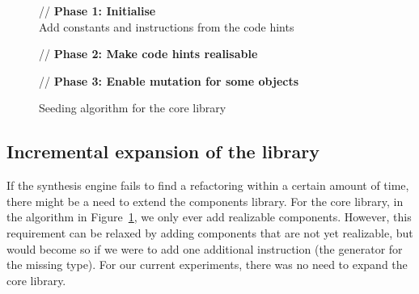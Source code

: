 \documentclass[sigconf,review,anonymous]{acmart}
\makeatletter
\newcommand{\removelatexerror}{\let\@latex@error\@gobble}
\makeatother
\begin{document}
\begin{figure}
\removelatexerror%
\begin{algorithm}[H]
\SetAlgoLined
{}
// {\bf Phase 1: Initialise}\\
Add constants and instructions from the code hints\;

// {\bf Phase 2: Make code hints realisable}\\

// {\bf Phase 3: Enable mutation for some objects}\\
\end{algorithm}
 \caption{Seeding algorithm for the core library}
\label{alg:seeding-core}
\end{figure}



\subsection{Incremental expansion of the library} \label{sec:extend-library}
If the synthesis engine fails to find a refactoring within a certain amount of time,
there might be a need to extend the components library.
For the core library, in the algorithm in Figure~\ref{alg:seeding-core}, we only ever add realizable components. However, this requirement can be relaxed by adding components that
are not yet realizable, but would become so if we were to add one
additional instruction (the generator for the missing type). For our current experiments,
there was no need to expand the core library. 
\end{document}

